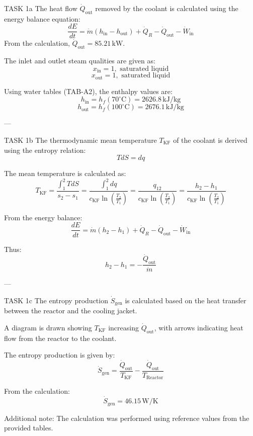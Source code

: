 TASK 1a  
The heat flow \( \dot{Q}_{\text{out}} \) removed by the coolant is calculated using the energy balance equation:  
\[
\frac{dE}{dt} = \dot{m} (h_{\text{in}} - h_{\text{out}}) + \dot{Q}_R - \dot{Q}_{\text{out}} - \dot{W}_{\text{in}}
\]  
From the calculation, \( \dot{Q}_{\text{out}} = 85.21 \, \text{kW} \).  

The inlet and outlet steam qualities are given as:  
\[
x_{\text{in}} = 1, \text{ saturated liquid}
\]  
\[
x_{\text{out}} = 1, \text{ saturated liquid}
\]  

Using water tables (TAB-A2), the enthalpy values are:  
\[
h_{\text{in}} = h_f(70^\circ\text{C}) = 2626.8 \, \text{kJ/kg}
\]  
\[
h_{\text{out}} = h_f(100^\circ\text{C}) = 2676.1 \, \text{kJ/kg}
\]  

---

TASK 1b  
The thermodynamic mean temperature \( T_{\text{KF}} \) of the coolant is derived using the entropy relation:  
\[
T dS = dq
\]  

The mean temperature is calculated as:  
\[
T_{\text{KF}} = \frac{\int_{1}^{2} T dS}{s_2 - s_1} = \frac{\int_{1}^{2} dq}{c_{\text{KF}} \ln\left(\frac{T_2}{T_1}\right)} = \frac{q_{12}}{c_{\text{KF}} \ln\left(\frac{T_2}{T_1}\right)} = \frac{h_2 - h_1}{c_{\text{KF}} \ln\left(\frac{T_2}{T_1}\right)}
\]  

From the energy balance:  
\[
\frac{dE}{dt} = \dot{m} (h_2 - h_1) + \dot{Q}_R - \dot{Q}_{\text{out}} - \dot{W}_{\text{in}}
\]  

Thus:  
\[
h_2 - h_1 = -\frac{\dot{Q}_{\text{out}}}{\dot{m}}
\]  

---

TASK 1c  
The entropy production \( \dot{S}_{\text{gen}} \) is calculated based on the heat transfer between the reactor and the cooling jacket.  

A diagram is drawn showing \( T_{\text{KF}} \) increasing \( \dot{Q}_{\text{out}} \), with arrows indicating heat flow from the reactor to the coolant.  

The entropy production is given by:  
\[
\dot{S}_{\text{gen}} = \frac{\dot{Q}_{\text{out}}}{T_{\text{KF}}} - \frac{\dot{Q}_{\text{out}}}{T_{\text{Reactor}}}
\]  

From the calculation:  
\[
\dot{S}_{\text{gen}} = 46.15 \, \text{W/K}
\]  

Additional note: The calculation was performed using reference values from the provided tables.
